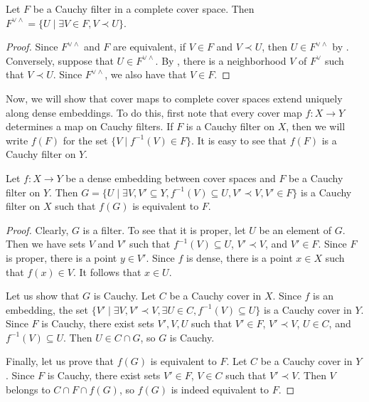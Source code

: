 \documentclass[reqno]{amsart}
\theoremstyle{definition}
\theoremstyle{remark}
\numberwithin{figure}{section}
\newcommand{\rb}{\prec}
\begin{document}
\begin{lem}
Let $F$ be a Cauchy filter in a complete cover space.
Then $F^{\vee \wedge} = \{ U \mid \exists V \in F, V \rb U \}$.
\end{lem}
\begin{proof}
Since $F^{\vee \wedge}$ and $F$ are equivalent, if $V \in F$ and $V \rb U$, then $U \in F^{\vee \wedge}$ by .
Conversely, suppose that $U \in F^{\vee \wedge}$.
By , there is a neighborhood $V$ of $F^\vee$ such that $V \rb U$.
Since $F^{\vee \wedge}$, we also have that $V \in F$.
\end{proof}

Now, we will show that cover maps to complete cover spaces extend uniquely along dense embeddings.
To do this, first note that every cover map $f : X \to Y$ determines a map on Cauchy filters.
If $F$ is a Cauchy filter on $X$, then we will write $f(F)$ for the set $\{ V \mid f^{-1}(V) \in F \}$.
It is easy to see that $f(F)$ is a Cauchy filter on $Y$.

\begin{lem}
Let $f : X \to Y$ be a dense embedding between cover spaces and $F$ be a Cauchy filter on $Y$.
Then $G = \{ U \mid \exists V,V' \subseteq Y, f^{-1}(V) \subseteq U, V' \rb V, V' \in F \}$ is a Cauchy filter on $X$ such that $f(G)$ is equivalent to $F$.
\end{lem}
\begin{proof}
Clearly, $G$ is a filter.
To see that it is proper, let $U$ be an element of $G$.
Then we have sets $V$ and $V'$ such that $f^{-1}(V) \subseteq U$, $V' \rb V$, and $V' \in F$.
Since $F$ is proper, there is a point $y \in V'$.
Since $f$ is dense, there is a point $x \in X$ such that $f(x) \in V$.
It follows that $x \in U$.

Let us show that $G$ is Cauchy.
Let $C$ be a Cauchy cover in $X$.
Since $f$ is an embedding, the set $\{ V' \mid \exists V, V' \rb V, \exists U \in C, f^{-1}(V) \subseteq U \}$ is a Cauchy cover in $Y$.
Since $F$ is Cauchy, there exist sets $V',V,U$ such that $V' \in F$, $V' \rb V$, $U \in C$, and $f^{-1}(V) \subseteq U$.
Then $U \in C \cap G$, so $G$ is Cauchy.

Finally, let us prove that $f(G)$ is equivalent to $F$.
Let $C$ be a Cauchy cover in $Y$.
Since $F$ is Cauchy, there exist sets $V' \in F$, $V \in C$ such that $V' \rb V$.
Then $V$ belongs to $C \cap F \cap f(G)$, so $f(G)$ is indeed equivalent to $F$.
\end{proof}
\end{document}
